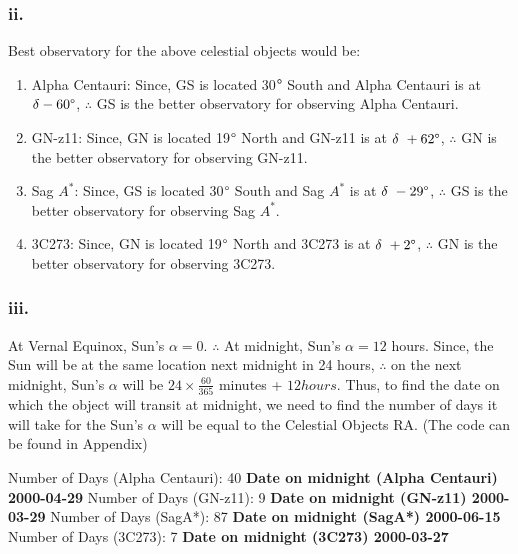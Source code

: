 \documentclass{article}
\begin{document}
        \subsubsection*{ii.}
        Best observatory for the above celestial objects would be:
            \begin{enumerate}
                \item Alpha Centauri: Since, GS is located 30$\degree$ South and Alpha Centauri is at $\delta -60\degree$, $\therefore$ GS is the better observatory for observing Alpha Centauri.
                \item GN-z11: Since, GN is located 19$\degree$ North and GN-z11 is at $\delta ~ +62\degree$, $\therefore$ GN is the better observatory for observing GN-z11.
                \item Sag $A^{*}$: Since, GS is located 30$\degree$ South and Sag $A^{*}$ is at $\delta ~ -29\degree$, $\therefore$ GS is the better observatory for observing Sag $A^{*}$.
                \item 3C273: Since, GN is located 19$\degree$ North and 3C273 is at $\delta ~ +2\degree$, $\therefore$ GN is the better observatory for observing 3C273.
            \end{enumerate}
            
        \subsubsection*{iii.}
            At Vernal Equinox, Sun's $\alpha = 0$. $\therefore$ At midnight, Sun's $\alpha = 12$ hours.
            Since, the Sun will be at the same location next midnight in 24 hours, $\therefore$ on the next midnight, Sun's $\alpha$ will be $24\times \frac{60}{365}$ minutes + $12 hours$.\newline
            Thus, to find the date on which the object will transit at midnight, we need to find the number of days it will take for the Sun's $\alpha$ will be equal to the Celestial Objects RA. (The code can be found in Appendix)\newline
            
            Number of Days (Alpha Centauri):  40\newline
            \textbf{Date on midnight (Alpha Centauri) 2000-04-29} \newline
            Number of Days (GN-z11):  9\newline
            \textbf{Date on midnight (GN-z11) 2000-03-29} \newline
            Number of Days (SagA*):  87\newline
            \textbf{Date on midnight (SagA*) 2000-06-15} \newline
            Number of Days (3C273):  7\newline
            \textbf{Date on midnight (3C273) 2000-03-27}\newline
            
\end{document}

